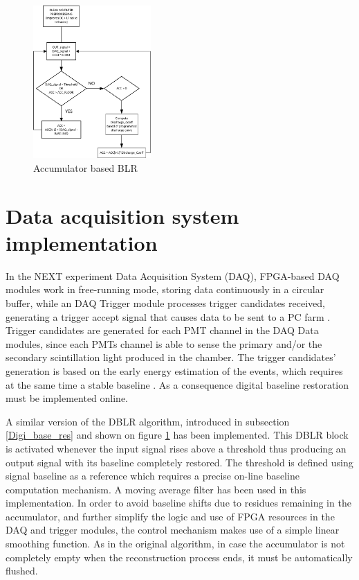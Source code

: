 \documentclass[a4paper, 10pt, oneside, twocolumn, 3p]{elsarticle}
\begin{document}
\begin{figure}[H]
	\begin{center}
		\includegraphics[width=0.4\textwidth]{./figures/BLR_acc_algo.pdf}
		\caption{Accumulator based BLR}
		\label{fig:BLR_acc_algor}
	\end{center}
\end{figure}

\section{Data acquisition system implementation}

\par In the NEXT experiment Data Acquisition System (DAQ), FPGA-based DAQ modules work in free-running mode, storing data continuously in a circular buffer, while an DAQ Trigger module processes trigger candidates received, generating a trigger accept signal that causes data to be sent to a PC farm \cite{1748-0221-11-01-C01008}. Trigger candidates are generated for each PMT channel in the DAQ Data modules, since each PMTs channel is able to sense the primary and/or the secondary scintillation light produced in the chamber. The trigger candidates’ generation is based on the early energy estimation of the events, which requires at the same time a stable baseline \cite{1748-0221-7-12-C12001}. As a consequence digital baseline restoration must be implemented online.

\par A similar version of the DBLR algorithm, introduced in subsection \ref{Digi_base_res} and shown on figure \ref{fig:BLR_acc_algor} has been implemented. This DBLR block is activated whenever the input signal rises above a threshold thus producing an output signal with its baseline completely restored. The threshold  is defined using signal baseline as a reference which requires a precise on-line baseline computation mechanism. A moving average filter has been used in this implementation. In order to avoid baseline shifts due to residues remaining in the accumulator, and further simplify the logic and use of FPGA resources in the DAQ and trigger modules, the control mechanism makes use of a simple linear smoothing function. As in the original algorithm, in case the accumulator is not completely empty when the reconstruction process ends, it must be automatically flushed.
\end{document}
